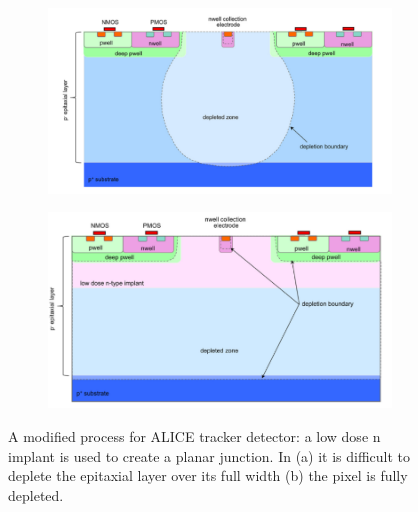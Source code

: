       \begin{figure}
         \centering
         \begin{subfigure}[b]{0.52\textwidth}
             \centering
             \includegraphics[width=\linewidth]{figures/Pixel_detectors/ALPIDE_before_PM.png}
             \caption{}
             \label{fig:ALPIDE_before_PM}
         \end{subfigure}
         \hfill
         \begin{subfigure}[b]{0.47\textwidth}
             \centering
             \includegraphics[width=\linewidth]{figures/Pixel_detectors/ALPIDE_after_PM.png} 
             \caption{}
             \label{fig:ALPIDE_after_PM}
         \end{subfigure}
         \label{fig:modified_process}
         \caption{A modified process for ALICE tracker detector: a low dose n implant is used to create a planar junction. In (a) it is difficult to deplete the epitaxial layer over its full
         width (b) the pixel is fully depleted.}
      \end{figure}

